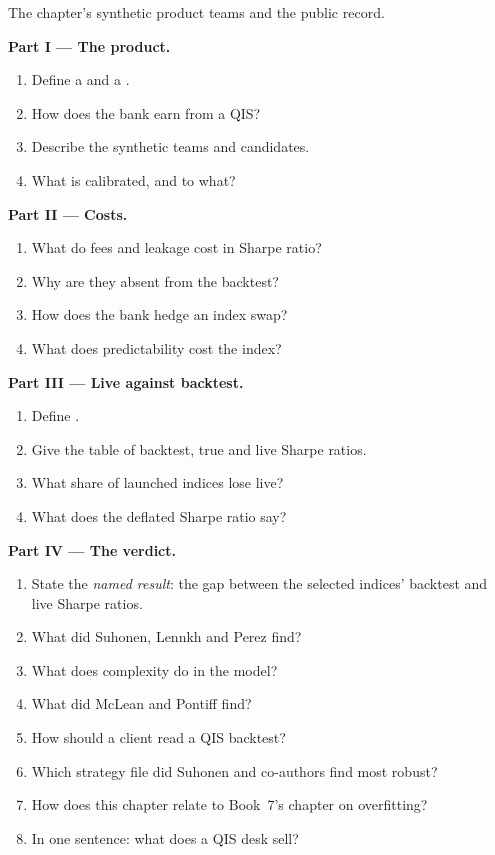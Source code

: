 \begin{problem}\label{pb:s2:quantitative-investment-strategies:1}
The chapter's synthetic product teams and the public record.

\medskip\noindent\textbf{Part I --- The product.}
\begin{enumerate}
\item Define a  and a .
\item How does the bank earn from a QIS?
\item Describe the synthetic teams and candidates.
\item What is calibrated, and to what?
\end{enumerate}

\medskip\noindent\textbf{Part II --- Costs.}
\begin{enumerate}[resume]
\item What do fees and leakage cost in Sharpe ratio?
\item Why are they absent from the backtest?
\item How does the bank hedge an index swap?
\item What does predictability cost the index?
\end{enumerate}

\medskip\noindent\textbf{Part III --- Live against backtest.}
\begin{enumerate}[resume]
\item Define .
\item Give the table of backtest, true and live Sharpe ratios.
\item What share of launched indices lose live?
\item What does the deflated Sharpe ratio say?
\end{enumerate}

\medskip\noindent\textbf{Part IV --- The verdict.}
\begin{enumerate}[resume]
\item State the \emph{named result}: the gap between the selected indices' backtest and live Sharpe ratios.
\item What did Suhonen, Lennkh and Perez find?
\item What does complexity do in the model?
\item What did McLean and Pontiff find?
\item How should a client read a QIS backtest?
\item Which strategy file did Suhonen and co-authors find most robust?
\item How does this chapter relate to Book~7's chapter on overfitting?
\item In one sentence: what does a QIS desk sell?
\end{enumerate}
\end{problem}

